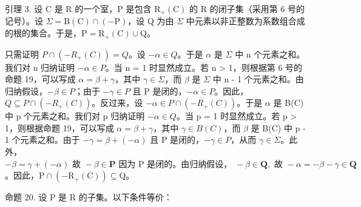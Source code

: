 引理 3. 设 C 是 R 的一个室，P 是包含 \(\mathrm{R}_{+}(\mathrm{C})\) 的 R 的闭子集（采用第 6 号的记号）。设 \(\Sigma = \mathrm{B}(\mathrm{C}) \cap (-\mathrm{P})\)，设 Q 为由 \(\Sigma\) 中元素以非正整数为系数组合成的根的集合。于是，\(\mathrm{P} = \mathrm{R}_{+}(\mathrm{C}) \cup \mathrm{Q}\)。

只需证明 \(P \cap (-R_{+}(C)) = Q\)。设 \(-\alpha \in Q\)。于是 \(\alpha\) 是 \(\Sigma\) 中 n 个元素之和。我们对 n 归纳证明 \(-\alpha \in P\)。当 n = 1 时显然成立。若 n \textgreater{} 1，则根据第 6 号的命题 19，可以写成 \(\alpha = \beta + \gamma\)，其中 \(\gamma \in \Sigma\)，而 \(\beta\) 是 \(\Sigma\) 中 n - 1 个元素之和。由归纳假设，\(-\beta \in P\)；由于 \(-\gamma \in P\) 且 P 是闭的，\(-\alpha \in P\)。因此，\(Q \subseteq P \cap (-R_{+}(C))\)。反过来，设 \(-\alpha \in P \cap (-R_{+}(C))\)。于是 \(\alpha\) 是 B(C) 中 p 个元素之和。我们对 p 归纳证明 \(-\alpha \in Q\)。当 p = 1 时显然成立。若 p \textgreater{} 1，则根据命题 19，可以写成 \(\alpha = \beta + \gamma\)，其中 \(\gamma \in B(C)\)，而 \(\beta\) 是 B(C) 中 p - 1 个元素之和。由于 \(-\gamma = \beta + (-\alpha)\) 且 P 是闭的，\(-\gamma \in P\)，从而 \(\gamma \in \Sigma\)。此外，\(-\beta = \gamma + (-\alpha) \text{ 故 } -\beta \in \mathbf{P} \text{ 因为 P 是闭的。由归纳假设， } -\beta \in \mathbf{Q}, \text{ 故 } -\alpha = -\beta - \gamma \in \mathbf{Q}\)。因此，\(\mathrm{P} \cap (-\mathrm{R}_{+}(\mathrm{C})) \subseteq \mathrm{Q}\)。

命题 20. 设 P 是 R 的子集。以下条件等价：


